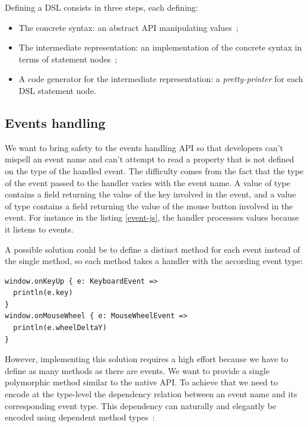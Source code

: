 \documentclass[american,english,runningheads]{llncs}
\begin{document}
Defining a DSL consists in three steps, each defining:

\begin{itemize}
\item The concrete syntax: an abstract API manipulating  values~;
\item The intermediate representation: an implementation of the concrete syntax in terms of statement nodes~;
\item A code generator for the intermediate representation: a \emph{pretty-printer} for each DSL statement node.
\end{itemize}

\subsection{Events handling}

We want to bring safety to the events handling API so that developers can’t mispell an event name and can’t attempt to read a property that is not defined on the type of the handled event. The difficulty comes from the fact that the type of the event passed to the handler varies with the event name. A value of type  contains a  field returning the value of the key involved in the event, and a value of type  contains a  field returning the value of the mouse button involved in the event. For instance in the listing \ref{event-js}, the handler processses  values because it listens to  events.

A possible solution could be to define a distinct method for each event instead of the single  method, so each method takes a handler with the according event type:

\begin{lstlisting}
window.onKeyUp { e: KeyboardEvent =>
  println(e.key)
}
window.onMouseWheel { e: MouseWheelEvent =>
  println(e.wheelDeltaY)
}
\end{lstlisting}

However, implementing this solution requires a high effort because we have to define as many methods as there are events. We want to provide a single polymorphic method similar to the native API. To achieve that we need to encode at the type-level the dependency relation between an event name and its corresponding event type. This dependency can naturally and elegantly be encoded using dependent method types~\cite{Oliveira10_Typeclasses}:
\end{document}
